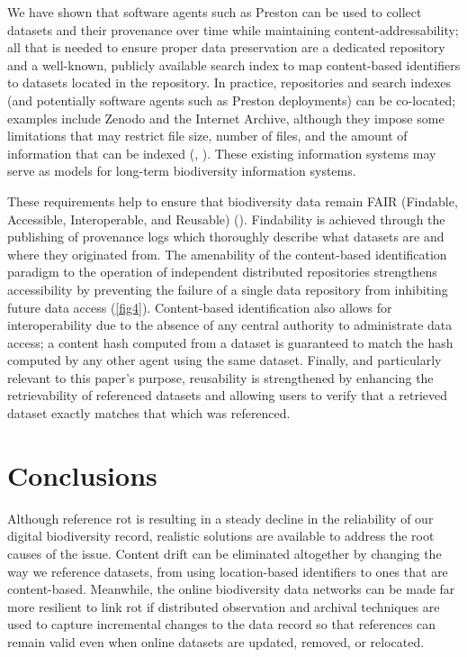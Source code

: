 \documentclass[12pt,letterpaper]{article}
\begin{document}
We have shown that software agents such as Preston can be used to collect datasets and their provenance over time while maintaining content-addressability; all that is needed to ensure proper data preservation are a dedicated repository and a well-known, publicly available search index to map content-based identifiers to datasets located in the repository. In practice, repositories and search indexes (and potentially software agents such as Preston deployments) can be co-located; examples include Zenodo and the Internet Archive, although they impose some limitations that may restrict file size, number of files, and the amount of information that can be indexed (\cite{zenodo_2019}, \cite{archive_2019}). These existing information systems may serve as models for long-term biodiversity information systems. 

These requirements help to ensure that biodiversity data remain FAIR (Findable, Accessible, Interoperable, and Reusable) (\cite{Wilkinson_2016}). Findability is achieved through the publishing of provenance logs which thoroughly describe what datasets are and where they originated from. The amenability of the content-based identification paradigm to the operation of independent distributed repositories strengthens accessibility by preventing the failure of a single data repository from inhibiting future data access (\ref{fig4}). Content-based identification also allows for interoperability due to the absence of any central authority to administrate data access; a content hash computed from a dataset is guaranteed to match the hash computed by any other agent using the same dataset. Finally, and particularly relevant to this paper’s purpose, reusability is strengthened by enhancing the retrievability of referenced datasets and allowing users to verify that a retrieved dataset exactly matches that which was referenced. 

\section*{Conclusions} 

Although reference rot is resulting in a steady decline in the reliability of our digital biodiversity record, realistic solutions are available to address the root causes of the issue. Content drift can be eliminated altogether by changing the way we reference datasets, from using location-based identifiers to ones that are content-based. Meanwhile, the online biodiversity data networks can be made far more resilient to link rot if distributed observation and archival techniques are used to capture incremental changes to the data record so that references can remain valid even when online datasets are updated, removed, or relocated.  
\end{document}
